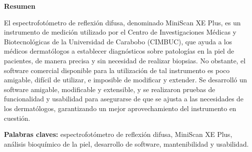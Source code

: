 \begin{center}
	\membrete
	\vfill
	\textbf{Resumen}
\end{center}

	\noindent
El espectrofot\'{o}metro de reflexi\'{o}n difusa, denominado MiniScan XE Plus, es un instrumento de medici\'{o}n utilizado por el Centro de Investigaciones M\'{e}dicas y Biotecnol\'{o}gicas de la Universidad de Carabobo (CIMBUC), que ayuda a los m\'{e}dicos dermat\'{o}logos a establecer diagn\'{o}sticos sobre patolog\'{i}as en la piel de pacientes, de manera precisa y sin necesidad de realizar biopsias. No obstante, el software comercial disponible para la utilizaci\'{o}n de tal instrumento es poco amigable, dif\'{i}cil de utilizar, e imposible de modificar y extender. Se desarroll\'{o} un software amigable, modificable y extensible, y se realizaron pruebas de funcionalidad y usabilidad para asegurarse de que se ajusta a las necesidades de los dermat\'{o}logos, garantizando un mejor aprovechamiento del instrumento en cuesti\'{o}n.

	\noindent
	\textbf{Palabras claves:} espectrofot\'{o}metro de reflexi\'{o}n difusa, MiniScan XE Plus, an\'{a}lisis bioqu\'{i}mico de la piel, desarrollo de software, mantenibilidad y usabilidad.

\vfill
\begin{minipage}[t]{0.45\textwidth}
	\begin{flushleft}
		\begin{center}
			\autor
		\end{center}
	\end{flushleft}
\end{minipage}
\begin{minipage}[t]{0.45\textwidth}
	\begin{flushright}
		\begin{center}
			\tutores
		\end{center}
	\end{flushright}
\end{minipage}
\vfill